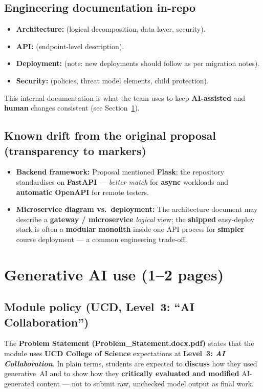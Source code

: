 \documentclass[11pt,a4paper]{article}
\begin{document}
\subsection{Engineering documentation in-repo}
\begin{itemize}
  \item \textbf{Architecture:}  (logical decomposition, data layer, security).
  \item \textbf{API:}  (endpoint-level description).
  \item \textbf{Deployment:}  (note: new deployments should follow  as per migration notes).
  \item \textbf{Security:}  (policies, threat model elements, child protection).
\end{itemize}

\noindent
This internal documentation is what the team uses to keep \textbf{AI-assisted} and \textbf{human} changes consistent (see Section~\ref{sec:genai}).

\subsection{Known drift from the original proposal (transparency to markers)}
\begin{itemize}
  \item \textbf{Backend framework:} Proposal mentioned \textbf{Flask}; the repository standardises on \textbf{FastAPI} --- \emph{better match} for \textbf{async} workloads and \textbf{automatic OpenAPI} for remote testers.
  \item \textbf{Microservice diagram vs.\ deployment:} The architecture document may describe a \textbf{gateway / microservice} \emph{logical} view; the \textbf{shipped} easy-deploy stack is often a \textbf{modular monolith} inside one API process for \textbf{simpler} course deployment --- a common engineering trade-off.
\end{itemize}

\section{Generative AI use (1--2 pages)}
\label{sec:genai}

\subsection{Module policy (UCD, Level~3: ``AI Collaboration'')}
The \textbf{Problem Statement (Problem\_Statement.docx.pdf)} states that the module uses \textbf{UCD College of Science} expectations at \textbf{Level~3: \emph{AI Collaboration}}. In plain terms, students are expected to \textbf{discuss} how they used generative~AI and to show how they \textbf{critically evaluated and modified} AI-generated content --- not to submit raw, unchecked model output as final work.
\end{document}
